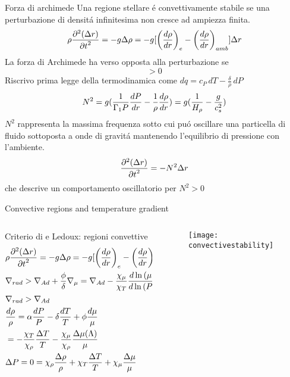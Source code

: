 \begin{wordonframe}{Forza di archimede}
Una regione stellare \'e convettivamente stabile se una perturbazione di densit\'a infinitesima non cresce ad ampiezza finita.
\begin{equation*}\label{eq:buoyancyEOM}
\rho\PtwoDy{t}{(\Delta r)}=-g\Delta\rho=-g[\Dcvar{\TDy{r}{\rho}}{e}-\Dcvar{\TDy{r}{\rho}}{amb}]\Delta r
\end{equation*}
La forza di Archimede ha verso opposta alla perturbazione se
\begin{equation*}
[\Dcvar{\TDy{r}{\rho}}{e}-\Dcvar{\TDy{r}{\rho}}{amb}]>0
\end{equation*}
Riscrivo prima legge della termodinamica come $dq=c_P\,dT-\frac{\delta}{\rho}\,dP$
\begin{equation*}
N^2=g(\frac{1}{\Gamma_1P}\TDy{r}{P}-\frac{1}{\rho}\TDy{r}{\rho})=g(\frac{1}{\densityscale{}}-\frac{g}{c_s^2})\label{eq:bvfs}
\end{equation*}
$N^2$ rappresenta la massima frequenza sotto cui pu\'o oscillare una particella di fluido sottoposta a onde di gravit\'a mantenendo l'equilibrio di pressione con l'ambiente.
\begin{equation*}
\PtwoDy{t}{(\Delta r)}=-N^2\Delta r
\end{equation*}
che descrive un comportamento oscillatorio per $N^2>0$
\end{wordonframe}

\begin{frame}{Convective regions and temperature gradient}
\begin{columns}[T]
	\begin{column}{0.6\textwidth}
\begin{block}{Criterio di \sch e Ledoux: regioni convettive}
	\begin{align*}
	&\rho\PtwoDy{t}{(\Delta r)}=-g\Delta\rho=-g[\Dcvar{\TDy{r}{\rho}}{e}-\Dcvar{\TDy{r}{\rho}}{amb}]\Delta r\\
	&\nrad{}>\nad+\frac{\phi}{\delta}\nmu{}=\nad-\frac{\chi_{\mu}}{\chi_T}\TDly{(P)}{(\mu)}\\
	&\nrad{}>\nad\\
	&\frac{d\rho}{\rho}=\alpha\frac{dP}{P}-\delta\frac{dT}{T}+\phi\frac{d\mu}{\mu}\\
	&=-\frac{\chi_T}{\chi_{\rho}}\frac{\Delta T}{T}-\frac{\chi_{\mu}}{\chi_{\rho}}\frac{\Delta\mu(\Lambda)}{\mu}\\
	&\Delta P=0=\chi_{\rho}\frac{\Delta\rho}{\rho}+\chi_T\frac{\Delta T}{T}+\chi_{\mu}\frac{\Delta\mu}{\mu}
	\end{align*}
\end{block}
	\end{column}
	\begin{column}{0.4\textwidth}
\begin{figure}[!ht]
	\texttt{[image: convectivestability]}\label{fig:convectivestability}
\end{figure}
\end{column}\end{columns}
\end{frame}

